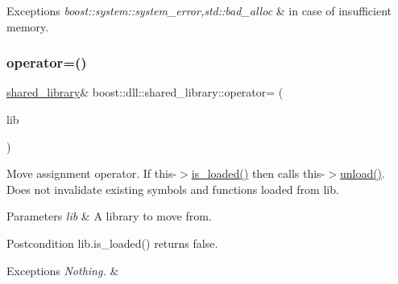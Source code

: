 \begin{DoxyExceptions}{Exceptions}
{\em boost\+::system\+::system\+\_\+error,std\+::bad\+\_\+alloc} & in case of insufficient memory. \\
\hline
\end{DoxyExceptions}
\mbox{\label{a01708_a174c64366a283023ca45b80ab27cdcfe}} 
\subsubsection{\texorpdfstring{operator=()}{operator=()}\hspace{0.1cm}{\footnotesize\ttfamily [2/2]}}
{\footnotesize\ttfamily \hyperlink{a01708}{shared\+\_\+library}\& boost\+::dll\+::shared\+\_\+library\+::operator= (\begin{DoxyParamCaption}\item[{B\+O\+O\+S\+T\+\_\+\+R\+V\+\_\+\+R\+EF(\hyperlink{a01708}{shared\+\_\+library})}]{lib }\end{DoxyParamCaption})\hspace{0.3cm}{\ttfamily [inline]}}

Move assignment operator. If this-\/$>$\hyperlink{a01708_a31ec32c213665bd151f2c615f89f94ef}{is\+\_\+loaded()} then calls this-\/$>$\hyperlink{a01708_a0c01ab046e5dcabe4c10db2a28cbe33e}{unload()}. Does not invalidate existing symbols and functions loaded from lib.


\begin{DoxyParams}{Parameters}
{\em lib} & A library to move from. \\
\hline
\end{DoxyParams}
\begin{DoxyPostcond}{Postcondition}
lib.\+is\+\_\+loaded() returns false. 
\end{DoxyPostcond}

\begin{DoxyExceptions}{Exceptions}
{\em Nothing.} & \\
\hline
\end{DoxyExceptions}
\mbox{\label{a01708_ae3a9dc520a6f3a67c75355b12a9f3a7f}} 
